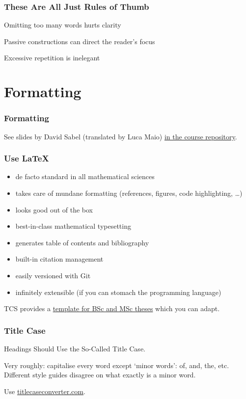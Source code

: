 \begin{frame}
  \frametitle{These Are All Just Rules of Thumb}

  Omitting too many words hurts clarity

  \medskip
  \pause

  Passive constructions can direct the reader's focus

  \medskip
  \pause

  Excessive repetition is inelegant
\end{frame}

\section{Formatting}

\begin{frame}
  \frametitle{Formatting}

  See slides by David Sabel (translated by Luca Maio) \href{https://github.com/JLimperg/sf-seminar-2024/}{in the course repository}.
\end{frame}

\begin{frame}
  \frametitle{Use \LaTeX}

  \begin{itemize}[<+->]
    \item de facto standard in all mathematical sciences
    \item takes care of mundane formatting (references, figures, code highlighting, \dots)
    \item looks good out of the box
    \item best-in-class mathematical typesetting
    \item generates table of contents and bibliography
    \item built-in citation management
    \item easily versioned with Git
    \item infinitely extensible (if you can stomach the programming language)
  \end{itemize}

  \medskip
  \pause

  TCS provides a \href{https://www.tcs.ifi.lmu.de/lehre/bsc-master-arbeiten_de.html}{template for BSc and MSc theses} which you can adapt.
\end{frame}

\begin{frame}
  \frametitle{Title Case}

  Headings Should Use the So-Called Title Case.

  \medskip

  Very roughly: capitalise every word except \enquote*{minor words}: of, and, the, etc.
  Different style guides disagree on what exactly is a minor word.

  \medskip
  \pause

  Use \url{titlecaseconverter.com}.
\end{frame}

